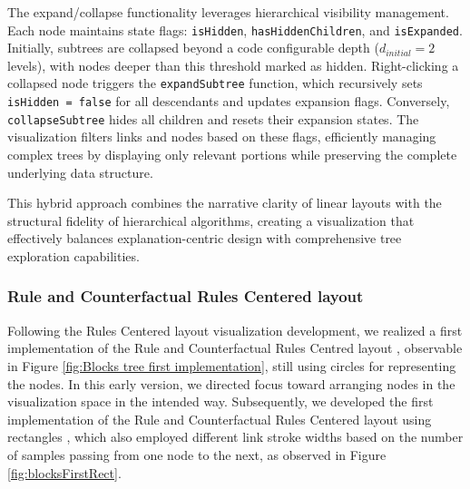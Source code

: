 The expand/collapse functionality leverages hierarchical visibility management. Each node maintains state flags: \texttt{isHidden}, \texttt{hasHiddenChildren}, and \texttt{isExpanded}. Initially, subtrees are collapsed beyond a code configurable depth ($d_{initial} = 2$ levels), with nodes deeper than this threshold marked as hidden. Right-clicking a collapsed node triggers the \texttt{expandSubtree} function, which recursively sets \texttt{isHidden = false} for all descendants and updates expansion flags. Conversely, \texttt{collapseSubtree} hides all children and resets their expansion states. The visualization filters links and nodes based on these flags, efficiently managing complex trees by displaying only relevant portions while preserving the complete underlying data structure.

This hybrid approach combines the narrative clarity of linear layouts with the structural fidelity of hierarchical algorithms, creating a visualization that effectively balances explanation-centric design with comprehensive tree exploration capabilities.

\subsubsection{Rule and Counterfactual Rules Centered layout} 

Following the Rules Centered layout visualization development, we realized a first implementation of the Rule and Counterfactual Rules Centred layout \cite{git27commit}, observable in Figure \ref{fig:Blocks tree first implementation}, still using circles for representing the nodes. In this early version, we directed focus toward arranging nodes in the visualization space in the intended way. Subsequently, we developed the first implementation of the Rule and Counterfactual Rules Centered layout using rectangles \cite{git28commit}, which also employed different link stroke widths based on the number of samples passing from one node to the next, as observed in Figure \ref{fig:blocksFirstRect}.

